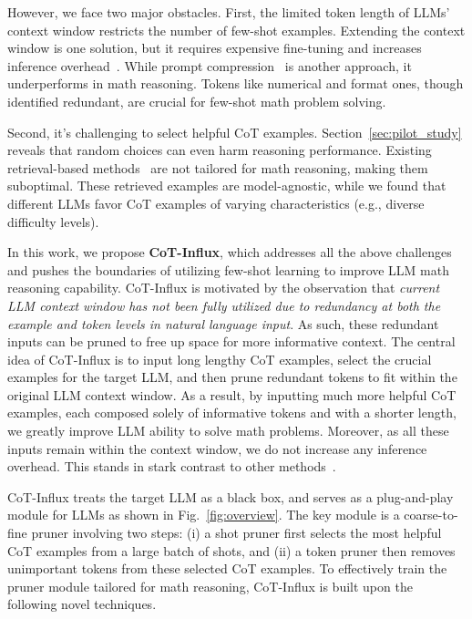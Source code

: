 However, we face two major obstacles. First, the limited token length of LLMs' context window restricts the number of few-shot examples. Extending the context window is one solution, but it requires expensive fine-tuning and increases inference overhead~\cite{pi,peng2023yarn}. While prompt compression~\cite{li2023compressing,llmlingua} is another approach, it underperforms in math reasoning. Tokens like numerical and format ones, though identified redundant, are crucial for few-shot math problem solving. 

Second,  {it's challenging to select helpful CoT examples}. 
Section~\ref{sec:pilot_study} reveals that random choices can even harm reasoning performance. Existing retrieval-based methods~\cite{topk,scarlatos2023reticl} are not tailored  for math reasoning, making them suboptimal. These retrieved examples are model-agnostic, while we found that different LLMs  favor CoT examples of varying characteristics (e.g., diverse difficulty levels).

In this work, we propose \textbf{CoT-Influx}, which addresses all the above challenges and pushes the boundaries of utilizing few-shot learning to improve  LLM math reasoning capability. {CoT-Influx} is motivated by the observation that \textit{current LLM context window has not been fully utilized due to redundancy at both the example and token levels in natural language input}. As such, these redundant inputs can be pruned to free up space for more informative context. The central idea of {CoT-Influx} is to input long lengthy CoT examples, select the crucial examples for the target LLM, and then prune redundant tokens to fit within the original LLM context window. As a result, by inputting much more helpful CoT examples, each composed solely of informative tokens and with a shorter length, we greatly improve LLM ability to solve math problems. Moreover, as all these inputs remain within the context window, we do not increase any inference overhead. This stands in stark contrast to other methods~\cite{hao2022structured,pi}.

{CoT-Influx} treats the target LLM as a black box, and serves as a plug-and-play module for LLMs as shown in Fig.~\ref{fig:overview}. The key module is a coarse-to-fine pruner involving two steps: (i) a shot pruner first selects the most helpful CoT examples from a large batch of shots,  and (ii) a token pruner then removes unimportant tokens from these selected CoT examples. To effectively train the pruner module tailored for math reasoning, {CoT-Influx} is built upon the following novel techniques. 

